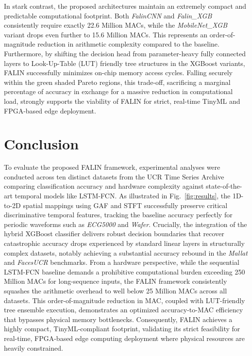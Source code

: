 \documentclass[10pt,conference]{IEEEtran}
\begin{document}
In stark contrast, the proposed architectures maintain an extremely compact and predictable computational footprint. Both \textit{FalinCNN} and \textit{Falin\_XGB} consistently require exactly 22.6 Million MACs, while the \textit{MobileNet\_XGB} variant drops even further to 15.6 Million MACs. This represents an order-of-magnitude reduction in arithmetic complexity compared to the baseline. Furthermore, by shifting the decision head from parameter-heavy fully connected layers to Look-Up-Table (LUT) friendly tree structures in the XGBoost variants, FALIN successfully minimizes on-chip memory access cycles. Falling securely within the green shaded Pareto regions, this trade-off, sacrificing a marginal percentage of accuracy in exchange for a massive reduction in computational load, strongly supports the viability of FALIN for strict, real-time TinyML and FPGA-based edge deployment.

\section{Conclusion}
\label{sec:conclusions}

To evaluate the proposed FALIN framework, experimental analyses were conducted across ten distinct datasets from the UCR Time Series Archive comparing classification accuracy and hardware complexity against state-of-the-art temporal models like LSTM-FCN. As illustrated in Fig.~\ref{fig:results}, the 1D-to-2D spatial mappings using GAF and STFT successfully preserve critical discriminative temporal features, tracking the baseline accuracy perfectly for periodic waveforms such as \textit{ECG5000} and \textit{Wafer}. Crucially, the integration of the hybrid XGBoost classifier  delivers robust decision boundaries that recover catastrophic accuracy drops experienced by standard linear layers in structurally complex datasets, notably achieving a substantial accuracy rebound in the \textit{Mallat} and \textit{FacesUCR} benchmarks. From a hardware perspective, while the sequential LSTM-FCN baseline demands a prohibitive computational burden exceeding 250 Million MACs for long-sequence inputs, the FALIN framework consistently squashes the arithmetic overhead to well below 25 Million MACs across all datasets. This order-of-magnitude reduction in MAC, coupled with LUT-friendly tree ensemble execution, demonstrates an optimized accuracy-to-MAC efficiency that bypasses physical memory bottlenecks. Consequently, FALIN achieves a highly compact, TinyML-compliant footprint, validating its strict feasibility for real-time, FPGA-based edge computing deployment where physical resources are heavily constrained.




\end{document}
